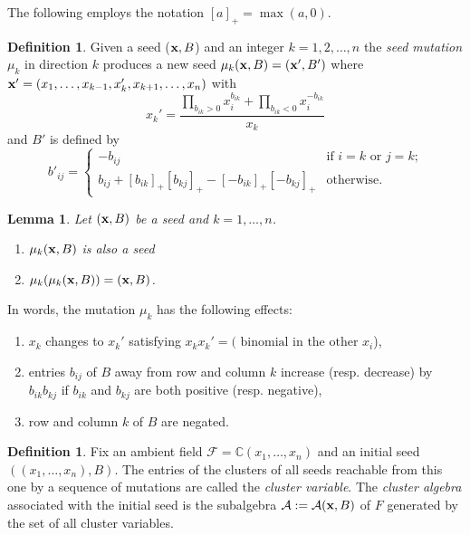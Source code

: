 \documentclass{amsart}
\newtheorem{lemma}[theorem]{Lemma}
\theoremstyle{definition}
\newtheorem{definition}[theorem]{Definition}
\theoremstyle{remark}
\numberwithin{equation}{section}
\newcommand{\cA}{{\mathcal{A}}}
\newcommand{\cF}{{\mathcal{F}}}
\newcommand{\x}{{\bf x}}
\newcommand{\bx}{{\bf x}}
\newcommand{\CC}{{\mathbb{C}}}
\begin{document}
	The following employs the notation $[a]_+ = \max(a,0)$.
	\begin{definition}
		Given a seed ($\x,B$) and an integer $k=1,2,\ldots, n$ the \emph{seed mutation} $\mu_k$ in direction $k$ produces a new seed $\mu_k(\x,B) = (\x',B')$ where $\x' = (x_1,\ldots, x_{k-1}, x_k', x_{k+1},\ldots, x_n)$ with 
		\begin{equation} \label{eq:exchange relation}
		x_k' = \frac{\prod_{b_{ik}>0} x_i^{b_{ik}} + \prod_{b_{ik}<0} x_i^{-b_{ik}}}{x_k}
		\end{equation}
		and $B'$ is defined by
		\begin{equation}\label{eq:matrix mutation}
      b'_{ij}=\begin{cases}
                 -b_{ij} & \text{if $i=k$ or $j=k$;}\\
                 b_{ij}+[b_{ik}]_+[b_{kj}]_+-[-b_{ik}]_+[-b_{kj}]_+ & \text{otherwise.}
               \end{cases}
    \end{equation}
	\end{definition}
		
	\begin{lemma} \label{lem:mutate}
	Let $(\x,B)$ be a seed and $k=1,\ldots, n$.
	\begin{enumerate}
		\item $\mu_k(\x,B)$ is also a seed
		\item $\mu_k(\mu_k(\x,B)) = (\x,B)$.
	\end{enumerate}
	\end{lemma}
	
	In words, the mutation $\mu_k$ has the following effects:
	\begin{enumerate}
	\item $x_k$ changes to $x_k'$ satisfying $x_kx_k' = (\textrm{ binomial in the other } x_i$),
	\item entries $b_{ij}$ of $B$ away from row and column $k$ increase (resp. decrease) by $b_{ik}b_{kj}$ if $b_{ik}$ and $b_{kj}$ are both positive (resp. negative),
	\item row and column $k$ of $B$ are negated.
	\end{enumerate}
	
	\begin{definition}
		Fix an ambient field $\cF = \CC(x_1,\ldots, x_n)$ and an initial seed $((x_1,\ldots, x_n), B)$.  The entries of the clusters of all seeds reachable from this one by a sequence of mutations are called the \emph{cluster variable}.  The \emph{cluster algebra} associated with the initial seed is the subalgebra $\cA:=\cA(\bx,B)$ of $F$ generated by the set of all cluster variables.
	\end{definition}
	
\end{document}
